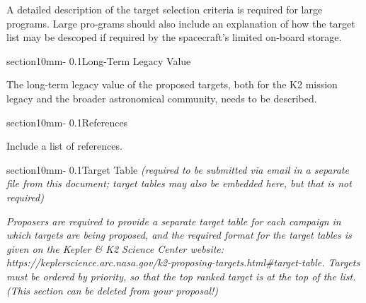 \documentclass[letterpaper,12pt]{article}
\makeatletter
\renewcommand{\section}{\@startsection%
{section}{1}{0mm}{-\baselineskip}%
{0.1\baselineskip}{\normalfont\bfseries}}%
\makeatother
\begin{document}
A detailed description of the target selection criteria is required for large programs. Large pro-grams should also include an explanation of how the target list may be descoped if required by the spacecraft’s limited on-board storage. 

\section{Long-Term Legacy Value}

The long-term legacy value of the proposed targets, both for the K2 mission legacy and the broader astronomical community, needs to be described.

\section{References}

Include a list of references.

\section{Target Table \textit{(required to be submitted via email in a separate file from this document; target tables may also be embedded here, but that is not required)}}

\textit{Proposers are required to provide a separate target table for each campaign in which targets are being proposed, and the required format for the target tables is given on the Kepler \& K2 Science Center website: https://keplerscience.arc.nasa.gov/k2-proposing-targets.html\#target-table. Targets must be ordered by priority, so that the top ranked target is at the top of the list. (This section can be deleted from your proposal!)}


\end{document}
